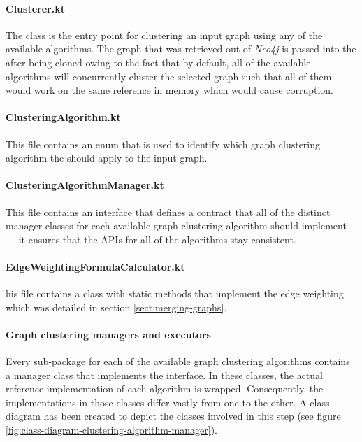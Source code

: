 \documentclass[12pt,a4paper]{report}
\begin{document}
\paragraph{Clusterer.kt}
The  class is the entry point for
clustering an input graph using any of the available algorithms. The graph that
was retrieved out of \textit{Neo4j} is passed into the  after
being cloned owing to the fact that by default, all of the available algorithms
will concurrently cluster the selected graph such that all of them would work
on the same reference in memory which would cause corruption.

\paragraph{ClusteringAlgorithm.kt}
This file contains an enum that is used to
identify which graph clustering algorithm the  should apply to
the input graph.

\paragraph{ClusteringAlgorithmManager.kt}
This file contains an interface that
defines a contract that all of the distinct manager classes for each available
graph clustering algorithm should implement --- it ensures that the APIs for
all of the algorithms stay consistent.

\paragraph{EdgeWeightingFormulaCalculator.kt}
his file contains a class with
static methods that implement the edge weighting which was detailed in section
\ref{sect:merging-graphs}.

\paragraph{Graph clustering managers and executors}
Every sub-package for each
of the available graph clustering algorithms contains a manager class that
implements the  interface. In these classes,
the actual reference implementation of each algorithm is wrapped. Consequently,
the implementations in those classes differ vastly from one to the other. A
class diagram has been created to depict the classes involved in this step (see
figure \ref{fig:class-diagram-clustering-algorithm-manager}).
\end{document}
